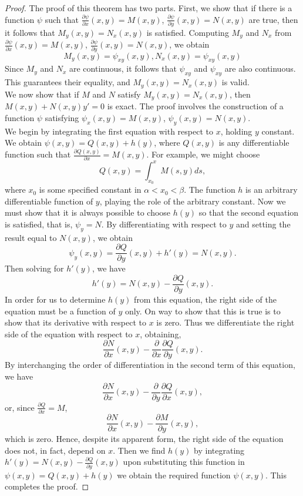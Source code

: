 \documentclass[10pt]{report}
\begin{document}
\begin{proof}
The proof of this theorem has two parts. First, we show that if there is a function $\psi$ such that $\frac{\partial \psi}{\partial x}(x,y)= M(x,y)$, $\frac{\partial \psi}{\partial y}(x,y) = N(x,y)$ are true, then it follows that $M_y(x,y) = N_x(x,y)$ is satisfied. Computing $M_y$ and $N_x$ from $\frac{\partial \psi}{\partial x}(x,y)= M(x,y)$, $\frac{\partial \psi}{\partial y}(x,y) = N(x,y)$, we obtain 
$$M_y(x,y) = \psi_{xy}(x,y), N_x(x,y) = \psi_{xy}(x,y)$$
Since $M_y$ and $N_x$ are continuous, it follows that $\psi_{xy}$ and $\psi_{xy}$ are also continuous. This guarantees their equality, and $M_y(x,y) = N_x(x,y)$ is valid.\\
We now show that if $M$ and $N$ satisfy $M_y(x,y) = N_x(x,y)$, then $M(x,y) + N(x,y)y'=0$ is exact. The proof involves the construction of a function $\psi$ satisfying $\psi_x(x,y) = M(x,y)$, $\psi_y(x,y) = N(x,y)$.\\
We begin by integrating the first equation with respect to $x$, holding $y$ constant. We obtain $\psi(x,y) = Q(x,y) + h(y)$, where $Q(x,y)$ is any differentiable function such that $\frac{\partial Q(x,y)}{\partial x} = M(x,y)$. For example, we might choose
$$Q(x,y) = \int_{x_0}^x M(s,y)ds,$$
where $x_0$ is some specified constant in $\alpha < x_0<\beta$. The function $h$ is an arbitrary differentiable function of $y$, playing the role of the arbitrary constant. Now we must show that it is always possible to choose $h(y)$ so that the second equation is satisfied, that is, $\psi_y = N$. By differentiating with respect to $y$ and setting the result equal to $N(x,y)$, we obtain
$$\psi_y(x,y) = \frac{\partial Q}{\partial y}(x,y) + h'(y) = N(x,y).$$
Then solving for $h'(y)$, we have
$$h'(y) = N(x,y) - \frac{\partial Q}{\partial y}(x,y).$$
In order for us to determine $h(y)$ from this equation, the right side of the equation must be a function of $y$ only. On way to show that this is true is to show that its derivative with respect to $x$ is zero. Thus we differentiate the right side of the equation with respect to $x$, obtaining,
$$\frac{\partial N}{\partial x}(x,y) - \frac{\partial}{\partial x}\frac{\partial Q}{\partial y}(x,y).$$
 By interchanging the order of differentiation in the second term of this equation, we have
$$\frac{\partial N}{\partial x}(x,y) - \frac{\partial}{\partial y}\frac{\partial Q}{\partial x}(x,y),$$
or, since $\frac{\partial Q}{\partial x} = M$,
$$\frac{\partial N}{\partial x}(x,y) - \frac{\partial M}{\partial y}(x,y),$$
which is zero. Hence, despite its apparent form, the right side of the equation does not, in fact, depend on $x$. Then we find $h(y)$ by integrating $h'(y) = N(x,y) - \frac{\partial Q}{\partial y}(x,y)$ upon substituting this function in $\psi(x,y) = Q(x,y) + h(y)$ we obtain the required function $\psi(x,y).$ This completes the proof.
\end{proof}
\end{document}
